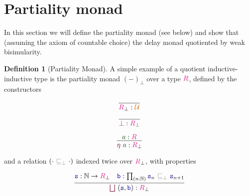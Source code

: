 \documentclass[twoside,11pt,openright]{report}
\theoremstyle{plain} %
\theoremstyle{definition}
\newtheorem{defn}{Definition}[section]
\theoremstyle{remark}
\newcommand*{\term}[1]{\textcolor{green!30!black}{#1}} %
\newcommand*{\type}[1]{\textcolor{magenta!90!black}{#1}}
\newcommand*{\universe}[1]{\textcolor{orange!80!black}{#1}}
\newcommand*{\relation}[1]{\textcolor{gray}{\ensuremath{\mathtt{#1}}}}
\newcommand*{\function}[1]{\textcolor{blue!60!black}{\ensuremath{\mathtt{#1}}}}
\newcommand*{\constructor}[1]{\textcolor{purple!60!black}{\ensuremath{\mathtt{#1}}}}
\begin{document}
\section{Partiality monad}
In this section we will define the partiality monad (see below) and show that (assuming the axiom of countable choice) the delay monad quotiented by weak bisimularity.
\begin{defn}[Partiality Monad]
  A simple example of a quotient inductive-inductive type is the partiality monad \((-)_\bot\) over a type \(\type{R}\), defined by the constructors\\[-9mm]
  \begin{center}
    \begin{minipage}{0.25\linewidth}
      \begin{equation}
        \infer{\type{R}_\bot : \universe{\mathcal{U}}}{}
      \end{equation}
    \end{minipage}
    \hfill
    \begin{minipage}{0.25\linewidth}
      \begin{equation}
        \infer{\constructor{\bot} : \type{R}_\bot}{}
      \end{equation}
    \end{minipage}
    \hfill
    \begin{minipage}{0.25\linewidth}
      \begin{equation}
        \infer{\constructor{\eta}~\term{a} : \type{R}_\bot}{\term{a} : \type{R}}
      \end{equation}
    \end{minipage}
  \end{center}
  and a relation \((\cdot~\relation{\sqsubseteq_{\bot}}~\cdot)\) indexed twice over \(\type{R}_\bot\), with properties\\[-9mm] 
  \begin{center}
    \begin{minipage}{0.45\linewidth}
      \begin{equation}
        \infer{\constructor{\bigsqcup}~(\function{s},\function{b}) : \type{R}_\bot}{\function{s} : \mathbb{N} \rightarrow \type{R}_\bot & \function{b} : \prod_{(n : \mathbb{N})} \function{s}_n~\relation{\sqsubseteq_{\bot}}~\function{s}_{n+1} }
      \end{equation}
    \end{minipage}

\end{center}
\end{defn}
\end{document}

